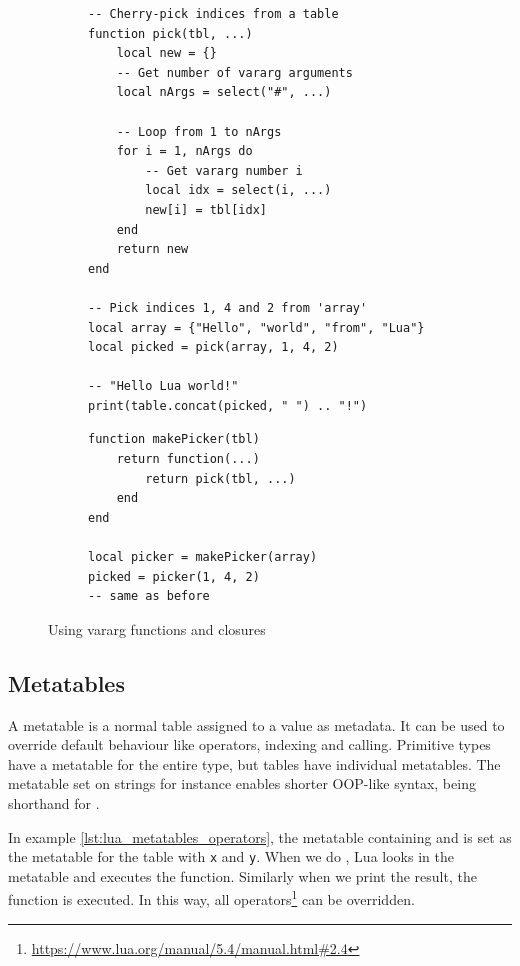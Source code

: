 \begin{figure}[ht]
\centering
\begin{subfigure}{0.55\textwidth}
\begin{verbatim}
-- Cherry-pick indices from a table
function pick(tbl, ...)
    local new = {}
    -- Get number of vararg arguments
    local nArgs = select("#", ...)
    
    -- Loop from 1 to nArgs
    for i = 1, nArgs do
        -- Get vararg number i
        local idx = select(i, ...)
        new[i] = tbl[idx]
    end
    return new
end

-- Pick indices 1, 4 and 2 from 'array'
local array = {"Hello", "world", "from", "Lua"}
local picked = pick(array, 1, 4, 2)

-- "Hello Lua world!"
print(table.concat(picked, " ") .. "!")
\end{verbatim}
\end{subfigure}
\begin{subfigure}[t]{0.44\textwidth}
\begin{verbatim}
function makePicker(tbl)
    return function(...)
        return pick(tbl, ...)
    end
end

local picker = makePicker(array)
picked = picker(1, 4, 2)
-- same as before
\end{verbatim}
\end{subfigure}
\caption{Using vararg functions and closures}
\label{lst:lua_vararg}
\end{figure}

\subsection{Metatables}
A metatable is a normal table assigned to a value as metadata. It can be used to override default behaviour like operators, indexing and calling. Primitive types have a metatable for the entire type, but tables have individual metatables. The metatable set on strings for instance enables shorter OOP-like syntax,  being shorthand for .

In example \ref{lst:lua_metatables_operators}, the metatable containing  and  is set as the metatable for the table with \texttt{x} and \texttt{y}. When we do , Lua looks in the metatable and executes the  function. Similarly when we print the result, the  function is executed. In this way, all operators\footnote{\url{https://www.lua.org/manual/5.4/manual.html#2.4}} can be overridden.

